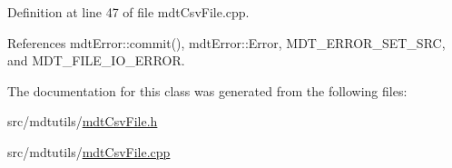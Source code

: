 Definition at line 47 of file mdt\-Csv\-File.\-cpp.



References mdt\-Error\-::commit(), mdt\-Error\-::\-Error, M\-D\-T\-\_\-\-E\-R\-R\-O\-R\-\_\-\-S\-E\-T\-\_\-\-S\-R\-C, and M\-D\-T\-\_\-\-F\-I\-L\-E\-\_\-\-I\-O\-\_\-\-E\-R\-R\-O\-R.



The documentation for this class was generated from the following files\-:\begin{DoxyCompactItemize}
\item 
src/mdtutils/\hyperlink{mdt_csv_file_8h}{mdt\-Csv\-File.\-h}\item 
src/mdtutils/\hyperlink{mdt_csv_file_8cpp}{mdt\-Csv\-File.\-cpp}\end{DoxyCompactItemize}

